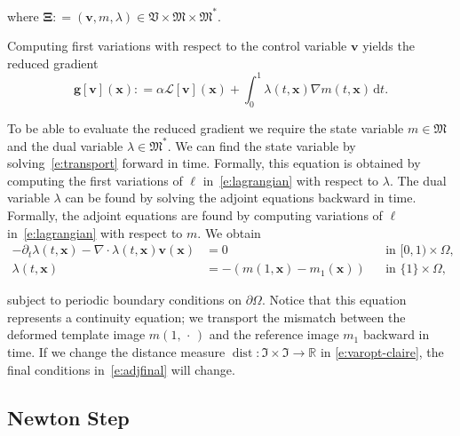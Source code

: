 \documentclass[11pt]{amsart}
\newcommand\fs[1]{\ensuremath{\mathfrak{#1}}}
\newcommand\op[1]{\ensuremath{\mathcal{#1}}}
\newcommand\igrad{\ensuremath{\nabla}}
\newcommand{\idiv}{\ensuremath{\nabla\cdot}}
\newcommand{\defeq}{\ensuremath{\mathrel{\mathop:}=}}
\renewcommand{\d}{\ensuremath{\text{d}}}
\renewcommand{\vec}[1]{\ensuremath{\boldsymbol{#1}}}
\newcommand\dual{\ensuremath{\ast}}
\begin{document}
\noindent where $\vec{\Xi} \defeq (\vec{v},m,\lambda) \in \fs{V} \times \fs{M} \times \fs{M}^\dual$.

Computing first variations with respect to the control variable $\vec{v}$ yields the reduced gradient
\begin{equation}\label{e:rgrad}
\vec{g}[\vec{v}](\vec{x})
\defeq \alpha \op{L} [\vec{v}](\vec{x})
+ \int_0^1 \lambda(t,\vec{x}) \igrad m(t,\vec{x}) \, \d t.
\end{equation}

To be able to evaluate the reduced gradient we require the state variable $m \in \fs{M}$ and the dual variable $\lambda \in \fs{M}^\dual$. We can find the state variable by solving~\eqref{e:transport} forward in time. Formally, this equation is obtained by computing the first variations of $\ell$ in~\eqref{e:lagrangian} with respect to $\lambda$. The dual variable $\lambda$ can be found by solving the adjoint equations backward in time. Formally, the adjoint equations are found by computing variations of $\ell$ in~\eqref{e:lagrangian} with respect to $m$. We obtain
\begin{subequations}
\label{e:adjoint}
\begin{align}
-\partial_t \lambda(t,\vec{x}) - \idiv \lambda(t,\vec{x}) \vec{v}(\vec{x})  & = 0
&& \text{in}\,\,[0,1) \times \Omega,
\\
\lambda(t,\vec{x}) &=  -(m(1,\vec{x}) - m_1(\vec{x}))
&& \text{in}\,\,\{1\} \times \Omega,
\label{e:adjfinal}
\end{align}
\end{subequations}

\noindent subject to periodic boundary conditions on $\partial\Omega$. Notice that this equation represents a continuity equation; we transport the mismatch between the deformed template image $m(1,\,\cdot\,)$ and the reference image $m_1$ backward in time. If we change the distance measure $\operatorname{dist} : \fs{I} \times \fs{I} \to \mathbb{R}$ in \eqref{e:varopt-claire}, the final conditions in~\eqref{e:adjfinal} will change.




\subsection{Newton Step}\label{s:newtonstep}
\end{document}
